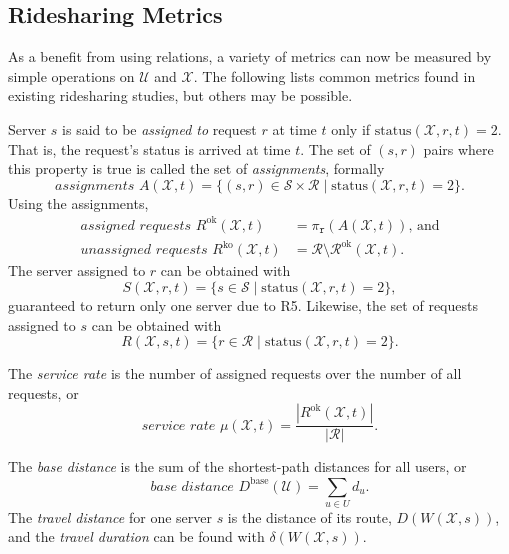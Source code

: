 \subsection{Ridesharing Metrics}
\label{ch:1:sec:ridesharing-metrics}
As a benefit from using relations, a variety of metrics can now be measured by
simple operations on $\mathcal{U}$ and $\mathcal{X}$.  The following lists
common metrics found in existing ridesharing studies, but others may be possible.

Server $s$ is said to be \emph{assigned to} request $r$ at time $t$ only if
$\textrm{status}(\mathcal{X},r,t)=2$. That is, the request's status is arrived at time $t$.
The set of $(s,r)$ pairs
where this property is true is called the set of \emph{assignments}, formally
\begin{equation}
\label{eq:assignments}
\textit{assignments }A(\mathcal{X},t)=
\{(s,r)\in\mathcal{S}\times \mathcal{R} \mid \textrm{status}(\mathcal{X},r,t)=2\}.
\end{equation}
Using the assignments,
\begin{align}
\label{eq:assigned-requests}
\textit{assigned requests }R^\textrm{ok}(\mathcal{X},t)&=\pi_\texttt{r}(A(\mathcal{X},t))\textrm{, and}\\
\label{eq:unassigned-requests}
\textit{unassigned requests }R^\textrm{ko}(\mathcal{X},t)&=\mathcal{R}\setminus\mathcal{R}^\textrm{ok}(\mathcal{X},t).
\end{align}
The server assigned to $r$ can be obtained with
\begin{equation}
S(\mathcal{X},r,t)=\{s\in\mathcal{S}\mid\textrm{status}(\mathcal{X},r,t)=2\},
\end{equation}
guaranteed to return only one server due to R5.
Likewise, the set of requests assigned to $s$ can be obtained with
\begin{equation}
\label{eq:R(X,s,t)}
R(\mathcal{X},s,t)=\{r\in\mathcal{R}\mid\textrm{status}(\mathcal{X},r,t)=2\}.
\end{equation}

The \emph{service rate} is the number of assigned requests over the number of all requests, or
\begin{equation}
\label{eq:service-rate}
\textit{service rate }\mu(\mathcal{X},t)=\frac{|R^\textrm{ok}(\mathcal{X},t)|}{|\mathcal{R}|}.
\end{equation}

The \emph{base distance} is the sum of the shortest-path distances for all users, or
\begin{equation}
\label{eq:base-distance}
\textit{base distance }D^\textrm{base}(\mathcal{U})=\sum_{u\in U}d_u.
\end{equation}
The \emph{travel distance} for one server $s$ is the distance of its route,
$D(W(\mathcal{X},s))$,
and the \emph{travel duration} can be found with
$\delta(W(\mathcal{X},s))$.

